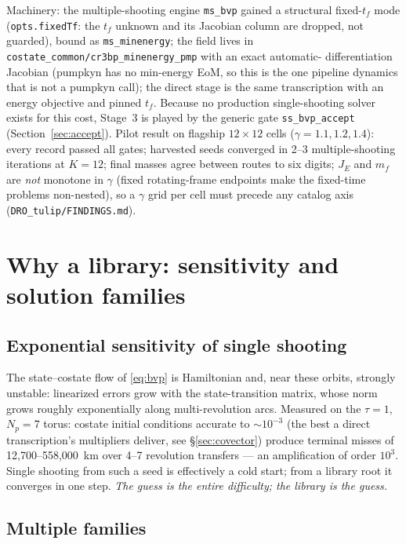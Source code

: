 \documentclass[11pt]{article}
\begin{document}
Machinery: the multiple-shooting engine \texttt{ms\_bvp} gained a
structural fixed-$t_f$ mode (\texttt{opts.fixedTf}: the $t_f$ unknown and its
Jacobian column are dropped, not guarded), bound as
\texttt{ms\_minenergy}; the field lives in
\texttt{costate\_common/cr3bp\_minenergy\_pmp} with an exact automatic-
differentiation Jacobian (pumpkyn has no min-energy EoM, so this is the one
pipeline dynamics that is not a pumpkyn call); the direct stage is the same
transcription with an energy objective and pinned $t_f$. Because no
production single-shooting solver exists for this cost, Stage~3 is played by
the generic gate \texttt{ss\_bvp\_accept} (Section~\ref{sec:accept}). Pilot
result on flagship $12\times12$ cells ($\gamma=1.1,1.2,1.4$): every record
passed all gates; harvested seeds converged in 2--3 multiple-shooting
iterations at $K=12$; final masses agree between routes to six digits;
$J_E$ and $m_f$ are \emph{not} monotone in $\gamma$ (fixed rotating-frame
endpoints make the fixed-time problems non-nested), so a $\gamma$ grid per
cell must precede any catalog axis (\texttt{DRO\_tulip/FINDINGS.md}).

\section{Why a library: sensitivity and solution families}

\subsection{Exponential sensitivity of single shooting}

The state--costate flow of \eqref{eq:bvp} is Hamiltonian and, near these
orbits, strongly unstable: linearized errors grow with the state-transition
matrix, whose norm grows roughly exponentially along multi-revolution
arcs. Measured on the $\tau=1$, $N_p=7$ torus: costate initial conditions
accurate to $\sim10^{-3}$ (the best a direct transcription's multipliers
deliver, see \S\ref{sec:covector}) produce terminal misses of
12{,}700--558{,}000~km over 4--7 revolution transfers --- an amplification
of order $10^3$. Single shooting from such a seed is effectively a cold
start; from a library root it converges in one step. \emph{The guess is the
entire difficulty; the library is the guess.}

\subsection{Multiple families}
\end{document}
